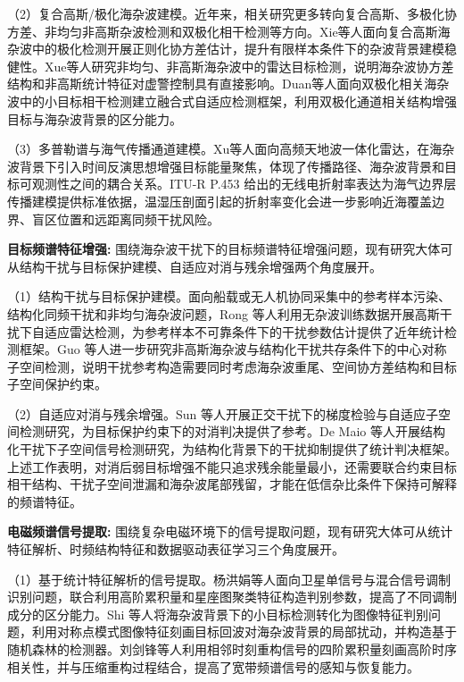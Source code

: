 （2）复合高斯/极化海杂波建模。近年来，相关研究更多转向复合高斯、多极化协方差、非均匀非高斯杂波检测和双极化相干检测等方向。Xie等人\cite{Xie2022PolarimetricCompoundGaussian}面向复合高斯海杂波中的极化检测开展正则化协方差估计，提升有限样本条件下的杂波背景建模稳健性。Xue等人\cite{Xue2022PersymmetricSeaClutter}研究非均匀、非高斯海杂波中的雷达目标检测，说明海杂波协方差结构和非高斯统计特征对虚警控制具有直接影响。Duan等人\cite{Duan2025FusionCoherent}面向双极化相关海杂波中的小目标相干检测建立融合式自适应检测框架，利用双极化通道相关结构增强目标与海杂波背景的区分能力。

（3）多普勒谱与海气传播通道建模。Xu等人\cite{Xu2025HSSWRTR}面向高频天地波一体化雷达，在海杂波背景下引入时间反演思想增强目标能量聚焦，体现了传播路径、海杂波背景和目标可观测性之间的耦合关系。ITU-R P.453\cite{ITURP453} 给出的无线电折射率表达为海气边界层传播建模提供标准依据，温湿压剖面引起的折射率变化会进一步影响近海覆盖边界、盲区位置和远距离同频干扰风险。


\textbf{目标频谱特征增强:}
围绕海杂波干扰下的目标频谱特征增强问题，现有研究大体可从结构干扰与目标保护建模、自适应对消与残余增强两个角度展开。

（1）结构干扰与目标保护建模。面向船载或无人机协同采集中的参考样本污染、结构化同频干扰和非均匀海杂波问题，Rong 等人\cite{Rong2022ClutterFreeTraining}利用无杂波训练数据开展高斯干扰下自适应雷达检测，为参考样本不可靠条件下的干扰参数估计提供了近年统计检测框架。Guo 等人\cite{Guo2024PersymmetricSubspaceSeaClutter}进一步研究非高斯海杂波与结构化干扰共存条件下的中心对称子空间检测，说明干扰参考构造需要同时考虑海杂波重尾、空间协方差结构和目标子空间保护约束。

（2）自适应对消与残余增强。Sun 等人\cite{Sun2022GradientOrthogonalInterference}开展正交干扰下的梯度检验与自适应子空间检测研究，为目标保护约束下的对消判决提供了参考。De Maio 等人\cite{DeMaio2016SubspaceInterference}开展结构化干扰下子空间信号检测研究，为结构化背景下的干扰抑制提供了统计判决框架。上述工作表明，对消后弱目标增强不能只追求残余能量最小，还需要联合约束目标相干结构、干扰子空间泄漏和海杂波尾部残留，才能在低信杂比条件下保持可解释的频谱特征。

\textbf{电磁频谱信号提取:}
围绕复杂电磁环境下的信号提取问题，现有研究大体可从统计特征解析、时频结构特征和数据驱动表征学习三个角度展开。

（1）基于统计特征解析的信号提取。杨洪娟等人\cite{Yang2022JointFeature}面向卫星单信号与混合信号调制识别问题，联合利用高阶累积量和星座图聚类特征构造判别参数，提高了不同调制成分的区分能力。Shi 等人\cite{Shi2025SDPSeaClutter}将海杂波背景下的小目标检测转化为图像特征判别问题，利用对称点模式图像特征刻画目标回波对海杂波背景的局部扰动，并构造基于随机森林的检测器。刘剑锋等人\cite{Liu2025HOCCSS}利用相邻时刻重构信号的四阶累积量刻画高阶时序相关性，并与压缩重构过程结合，提高了宽带频谱信号的感知与恢复能力。

